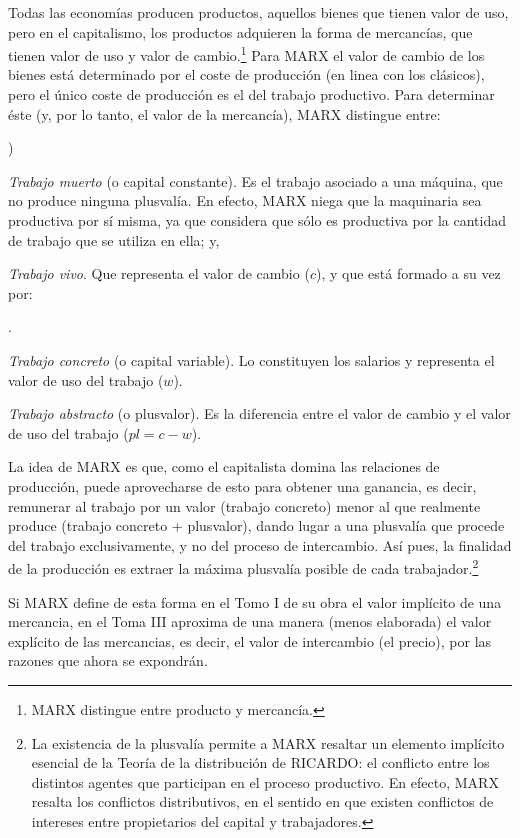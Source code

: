 \documentclass[10pt,a4paper]{article}
\newcounter{alphaitem}
\newcounter{numitem}
\newenvironment{la}
      {\begin{list}{\alph{alphaitem})}{%
          \usecounter{alphaitem}%
          \setlength{\leftmargin}{1cm}%
          \setlength{\parskip}{3pt}%
          \setlength{\itemsep}{0pt}%
          \setlength{\parsep}{0pt}%
      }}
      {\end{list}}
\newenvironment{lnum}
      {\begin{list}{\arabic{numitem}.}{%
          \usecounter{numitem}%
          \setlength{\leftmargin}{1cm}%
          \setlength{\parskip}{3pt}%
          \setlength{\itemsep}{0pt}%
          \setlength{\parsep}{0pt}%
      }}
      {\end{list}}
\begin{document}
Todas las economías producen productos, aquellos bienes que tienen valor de uso, pero en el capitalismo, los productos adquieren la forma de mercancías, que tienen valor de uso y valor de cambio.\footnote{MARX distingue entre producto y mercancía.} Para MARX el valor de cambio de los bienes está determinado por el coste de producción (en linea con los clásicos), pero el único coste de producción es el del trabajo productivo. Para determinar éste (y, por lo tanto, el valor de la mercancía), MARX distingue entre:
\begin{la}
    \item \textit{Trabajo muerto} (o capital constante). Es el trabajo asociado a una máquina, que no produce ninguna plusvalía. En efecto, MARX niega que la maquinaria sea productiva por sí misma, ya que considera que sólo es productiva por la cantidad de trabajo que se utiliza en ella; y,
    \item \textit{Trabajo vivo}. Que representa el valor de cambio ($c$), y que está formado a su vez por:
    \begin{lnum}
        \item \textit{Trabajo concreto} (o capital variable). Lo constituyen los salarios y representa el valor de uso del trabajo ($w$).
        \item \textit{Trabajo abstracto} (o plusvalor). Es la diferencia entre el valor de cambio y el valor de uso del trabajo ($pl=c−w$). 
    \end{lnum}
\end{la}

La idea de MARX es que, como el capitalista domina las relaciones de producción, puede aprovecharse de esto para obtener una ganancia, es decir, remunerar al trabajo por un valor (trabajo concreto) menor al que realmente produce (trabajo concreto + plusvalor), dando lugar a una plusvalía que procede del trabajo exclusivamente, y no del proceso de intercambio. Así pues, la finalidad de la producción es extraer la máxima plusvalía posible de cada trabajador.\footnote{%
    La existencia de la plusvalía permite a MARX resaltar un elemento implícito esencial de la Teoría de la distribución de RICARDO: el conflicto entre los distintos agentes que participan en el proceso productivo. En efecto, MARX resalta los conflictos distributivos, en el sentido en que existen conflictos de intereses entre propietarios del capital y trabajadores.
} 

Si MARX define de esta forma en el Tomo I de su obra el valor implícito de una mercancia, en el Toma III aproxima de una manera (menos elaborada) el valor explícito de las mercancias, es decir, el valor de intercambio (el precio), por las razones que ahora se expondrán.
\end{document}
